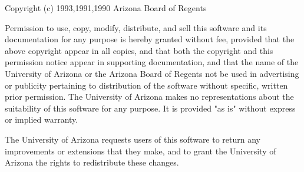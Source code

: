 % 
%
%

\noindent
\xk{}

\smallskip\noindent
Copyright (c) 1993,1991,1990  Arizona Board of Regents

\smallskip\noindent
Permission to use, copy, modify, distribute, and sell this software
and its documentation for any purpose is hereby granted without fee,
provided that the above copyright appear in all copies, and that both
the copyright and this permission notice appear in supporting
documentation, and that the name of the University of Arizona or the
Arizona Board of Regents not be used in advertising or publicity
pertaining to distribution of the software without specific, written
prior permission.  The University of Arizona makes no representations
about the suitability of this software for any purpose.  It is
provided "as is" without express or implied warranty.

\smallskip\noindent
The University of Arizona requests users of this software to return
any improvements or extensions that they make, and to grant the
University of Arizona the rights to redistribute these changes.

